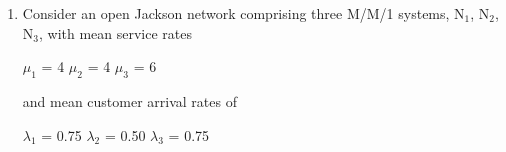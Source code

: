 \begin{enumerate}
Conclusions: 

MM1 is better than MM2 with half speed servers (aside:
there will always be a need for fast cpu's).
This carries over to MM1/2 better than MM2/2 with half speed servers.
MMc (infinite buffer) is a poor approximation to MMc/n (finite buffer).

Here is my code (in SML with l for $\lambda$, m for $\mu$, and r for $\rho$):

\small
\begin{verbatim}
fun mm1 l m = let val r = l/m
                  val Es = 1/m
                  val N = r/(1-r)
                  val T = Es/(1-r)
              in
                  (l, m, r, Es, N, T)
              end;

fun mm12 l m = let val r = l/m
                  val Es = 1/m
                  val N = r*(1+2*r)/(1+r+r*r)
                  val T = Es*(1+2*r)/(1+r)
              in
                  (l, m, r, Es, N, T)
              end;

fun mm2 l m = let val r = l/(2*m)
                  val Es = 1/m
                  val N = 2*r/(1-r*r)
                  val T = Es/(1-r*r)
              in
                  (l, m, r, Es, N, T)
              end;

fun mm22 l m = let val r = l/(2*m)
                  val Es = 1/m
                  val N = 2*r*(1+2*r)/(1+2*r+2*r*r)
                  val T = Es
               in
                   (l, m, r, Es, N, T)
               end;
\end{verbatim}
\normalsize

Typical calls: mm1 0.1 1.0; mm12 0.1 1.0; mm2 0.1 0.5; mm22 0.1 0.5;


\newpage


\item Consider an open Jackson network comprising
three M/M/1 systems, N$_1$, N$_2$, N$_3$, with mean service rates 

\begin{center}
$\mu_1$ = 4 \hspace*{0.5in} $\mu_2$ = 4 \hspace*{0.5in} $\mu_3$ = 6
\end{center}

and mean customer arrival rates of

\begin{center}
$\lambda_1$ = 0.75 \hspace*{0.5in} 
$\lambda_2$ = 0.50 \hspace*{0.5in} 
$\lambda_3$ = 0.75
\end{center}


\end{enumerate}
